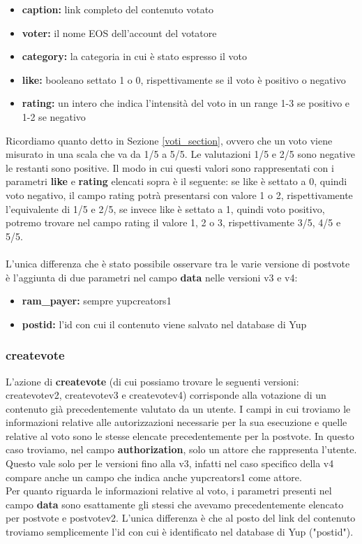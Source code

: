 \begin{itemize}
    \item \textbf{caption:} link completo del contenuto votato
    \item \textbf{voter:} il nome EOS dell'account del votatore
    \item \textbf{category:} la categoria in cui è stato espresso il voto
    \item \textbf{like:} booleano settato 1 o 0, rispettivamente se il voto è positivo o negativo
    \item \textbf{rating:} un intero che indica l'intensità del voto in un range 1-3 se positivo e 1-2 se negativo
\end{itemize}

Ricordiamo quanto detto in Sezione \ref{voti_section}, ovvero che un voto viene misurato in una scala che va da 1/5 a 5/5. Le valutazioni 1/5 e 2/5 sono negative le restanti sono positive. Il modo in cui questi valori sono rappresentati con i parametri \textbf{like} e \textbf{rating} elencati sopra è il seguente: se like è settato a 0, quindi voto negativo, il campo rating potrà presentarsi con valore 1 o 2, rispettivamente l'equivalente di 1/5 e 2/5, se invece like è settato a 1, quindi voto positivo, potremo trovare nel campo rating il valore 1, 2 o 3, rispettivamente 3/5, 4/5 e 5/5.
\\
\\
L'unica differenza che è stato possibile osservare tra le varie versione di postvote è l'aggiunta di due parametri nel campo \textbf{data} nelle versioni v3 e v4:

\begin{itemize}
    \item \textbf{ram\_payer:} sempre yupcreators1
    \item \textbf{postid:} l'id con cui il contenuto viene salvato nel database di Yup
\end{itemize}

\subsubsection{createvote}
L'azione di \textbf{createvote} (di cui possiamo trovare le seguenti versioni: createvotev2, createvotev3 e createvotev4) corrisponde alla votazione di un contenuto già precedentemente valutato da un utente.
I campi in cui troviamo le informazioni relative alle autorizzazioni necessarie per la sua esecuzione e quelle relative al voto sono le stesse elencate precedentemente per la postvote. In questo caso troviamo, nel campo \textbf{authorization}, solo un attore che rappresenta l'utente. Questo vale solo per le versioni fino alla v3, infatti nel caso specifico della v4 compare anche un campo che indica anche yupcreators1 come attore.
\\
Per quanto riguarda le informazioni relative al voto, i parametri presenti nel campo \textbf{data} sono esattamente gli stessi che avevamo precedentemente elencato per postvote e postvotev2. L'unica differenza è che al posto del link del contenuto troviamo semplicemente l'id con cui è identificato nel database di Yup ("postid").

